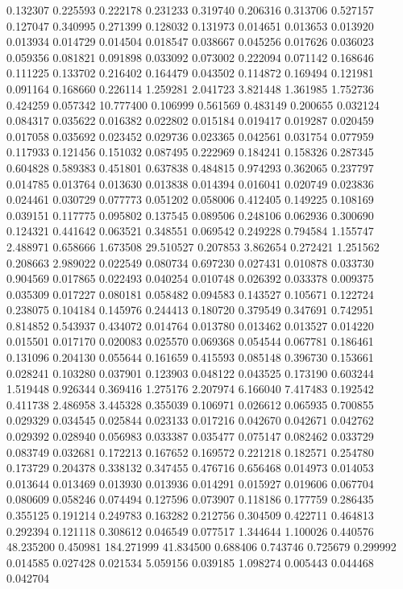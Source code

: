 0.132307
0.225593
0.222178
0.231233
0.319740
0.206316
0.313706
0.527157
0.127047
0.340995
0.271399
0.128032
0.131973
0.014651
0.013653
0.013920
0.013934
0.014729
0.014504
0.018547
0.038667
0.045256
0.017626
0.036023
0.059356
0.081821
0.091898
0.033092
0.073002
0.222094
0.071142
0.168646
0.111225
0.133702
0.216402
0.164479
0.043502
0.114872
0.169494
0.121981
0.091164
0.168660
0.226114
1.259281
2.041723
3.821448
1.361985
1.752736
0.424259
0.057342
10.777400
0.106999
0.561569
0.483149
0.200655
0.032124
0.084317
0.035622
0.016382
0.022802
0.015184
0.019417
0.019287
0.020459
0.017058
0.035692
0.023452
0.029736
0.023365
0.042561
0.031754
0.077959
0.117933
0.121456
0.151032
0.087495
0.222969
0.184241
0.158326
0.287345
0.604828
0.589383
0.451801
0.637838
0.484815
0.974293
0.362065
0.237797
0.014785
0.013764
0.013630
0.013838
0.014394
0.016041
0.020749
0.023836
0.024461
0.030729
0.077773
0.051202
0.058006
0.412405
0.149225
0.108169
0.039151
0.117775
0.095802
0.137545
0.089506
0.248106
0.062936
0.300690
0.124321
0.441642
0.063521
0.348551
0.069542
0.249228
0.794584
1.155747
2.488971
0.658666
1.673508
29.510527
0.207853
3.862654
0.272421
1.251562
0.208663
2.989022
0.022549
0.080734
0.697230
0.027431
0.010878
0.033730
0.904569
0.017865
0.022493
0.040254
0.010748
0.026392
0.033378
0.009375
0.035309
0.017227
0.080181
0.058482
0.094583
0.143527
0.105671
0.122724
0.238075
0.104184
0.145976
0.244413
0.180720
0.379549
0.347691
0.742951
0.814852
0.543937
0.434072
0.014764
0.013780
0.013462
0.013527
0.014220
0.015501
0.017170
0.020083
0.025570
0.069368
0.054544
0.067781
0.186461
0.131096
0.204130
0.055644
0.161659
0.415593
0.085148
0.396730
0.153661
0.028241
0.103280
0.037901
0.123903
0.048122
0.043525
0.173190
0.603244
1.519448
0.926344
0.369416
1.275176
2.207974
6.166040
7.417483
0.192542
0.411738
2.486958
3.445328
0.355039
0.106971
0.026612
0.065935
0.700855
0.029329
0.034545
0.025844
0.023133
0.017216
0.042670
0.042671
0.042762
0.029392
0.028940
0.056983
0.033387
0.035477
0.075147
0.082462
0.033729
0.083749
0.032681
0.172213
0.167652
0.169572
0.221218
0.182571
0.254780
0.173729
0.204378
0.338132
0.347455
0.476716
0.656468
0.014973
0.014053
0.013644
0.013469
0.013930
0.013936
0.014291
0.015927
0.019606
0.067704
0.080609
0.058246
0.074494
0.127596
0.073907
0.118186
0.177759
0.286435
0.355125
0.191214
0.249783
0.163282
0.212756
0.304509
0.422711
0.464813
0.292394
0.121118
0.308612
0.046549
0.077517
1.344644
1.100026
0.440576
48.235200
0.450981
184.271999
41.834500
0.688406
0.743746
0.725679
0.299992
0.014585
0.027428
0.021534
5.059156
0.039185
1.098274
0.005443
0.044468
0.042704
